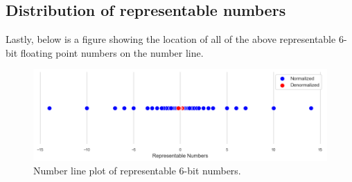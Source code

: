 \documentclass{article}
\begin{document}
\subsection*{Distribution of representable numbers}
Lastly, below is a figure showing the location of all of the above representable 6-bit floating point numbers on the number line. 

\begin{figure}[h]
    \centering
    \includegraphics[scale=0.7]{RepresentableNumbers.png}
    \caption{Number line plot of representable 6-bit numbers.}
    \label{fig:representable-numbers}
  \end{figure}
  
\end{document}
